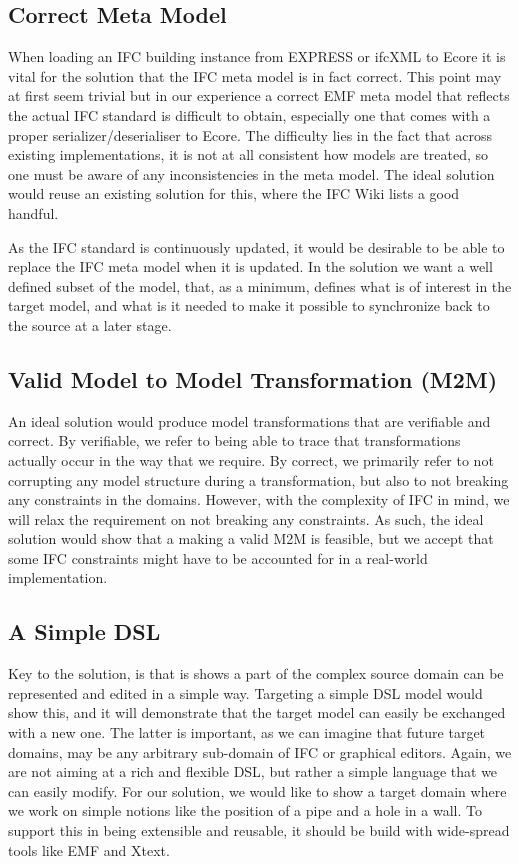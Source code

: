 \subsection{Correct Meta Model}
When loading an IFC building instance from EXPRESS or ifcXML to Ecore it is vital for the solution that the IFC meta model is in fact correct. This point may at first seem trivial but in our experience a correct EMF meta model that reflects the actual IFC standard is difficult to obtain, especially one that comes with a proper serializer/deserialiser to Ecore. The difficulty lies in the fact that across existing implementations, it is not at all consistent how models are treated, so one must be aware of any inconsistencies in the meta model.\cite[pp. 4]{quteprints37725} The ideal solution would reuse an existing solution for this, where the IFC Wiki lists a good handful.\cite{ifcwiki}

As the IFC standard is continuously updated, it would be desirable to be able to replace the IFC meta model when it is updated. In the solution we want a well defined subset of the model, that, as a minimum, defines what is of interest in the target model, and what is it needed to make it possible to synchronize back to the source at a later stage.

\subsection{Valid Model to Model Transformation (M2M)}
An ideal solution would produce model transformations that are verifiable and correct. By verifiable, we refer to being able to trace that transformations actually occur in the way that we require. By correct, we primarily refer to not corrupting any model structure during a transformation, but also to not breaking any constraints in the domains. However, with the complexity of IFC in mind, we will relax the requirement on not breaking any constraints. As such, the ideal solution would show that a making a valid M2M is feasible, but we accept that some IFC constraints might have to be accounted for in a real-world implementation.

\subsection{A Simple DSL}
Key to the solution, is that is shows a part of the complex source domain can be represented and edited in a simple way. Targeting a simple DSL model would show this, and it will demonstrate that the target model can easily be exchanged with a new one. The latter is important, as we can imagine that future target domains, may be any arbitrary sub-domain of IFC or graphical editors. Again, we are not aiming at a rich and flexible DSL, but rather a simple language that we can easily modify. For our solution, we would like to show a target domain where we work on simple notions like the position of a pipe and a hole in a wall. To support this in being extensible and reusable, it should be build with wide-spread tools like EMF and Xtext.

